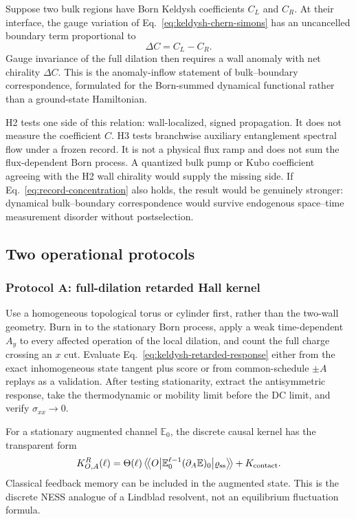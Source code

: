 \documentclass[aps,prb,onecolumn,nofootinbib,superscriptaddress]{revtex4-2}
\newcommand{\ssub}{\mathrm{ss}}
\begin{document}
Suppose two bulk regions have Born Keldysh coefficients $C_L$ and $C_R$.  At
their interface, the gauge variation of Eq.~\eqref{eq:keldysh-chern-simons}
has an uncancelled boundary term proportional to
\begin{equation}
  \Delta C=C_L-C_R.
\end{equation}
Gauge invariance of the full dilation then requires a wall anomaly with net
chirality $\Delta C$.  This is the anomaly-inflow statement of
bulk--boundary correspondence, formulated for the Born-summed dynamical
functional rather than a ground-state Hamiltonian.

H2 tests one side of this relation: wall-localized, signed propagation.  It
does not measure the coefficient $C$.  H3 tests branchwise auxiliary
entanglement spectral flow under a frozen record.  It is not a physical flux
ramp and does not sum the flux-dependent Born process.  A quantized bulk pump
or Kubo coefficient agreeing with the H2 wall chirality would supply the
missing side.  If Eq.~\eqref{eq:record-concentration} also holds, the result
would be genuinely stronger: dynamical bulk--boundary correspondence would
survive endogenous space--time measurement disorder without postselection.

\subsection{Two operational protocols}

\subsubsection{Protocol A: full-dilation retarded Hall kernel}

Use a homogeneous topological torus or cylinder first, rather than the
two-wall geometry.  Burn in to the stationary Born process, apply a weak
time-dependent $A_y$ to every affected operation of the local dilation, and
count the full charge crossing an $x$ cut.  Evaluate
Eq.~\eqref{eq:keldysh-retarded-response} either from the exact inhomogeneous
state tangent plus score or from common-schedule $\pm A$ replays as a
validation.  After testing stationarity, extract the antisymmetric response,
take the thermodynamic or mobility limit before the DC limit, and verify
$\sigma_{xx}\to0$.

For a stationary augmented channel $\mathbb E_0$, the discrete causal kernel
has the transparent form
\begin{equation}
  K^R_{O,A}(\ell)
  =\Theta(\ell)
  \left\langle\!\left\langle O\middle|
    \mathbb E_0^{\ell-1}(\partial_A\mathbb E)_0
    \middle|\varrho_{\ssub}\right\rangle\!\right\rangle
  +K_{\rm contact}.
  \label{eq:augmented-channel-kubo}
\end{equation}
Classical feedback memory can be included in the augmented state.  This is the
discrete NESS analogue of a Lindblad resolvent, not an equilibrium fluctuation
formula.
\end{document}
